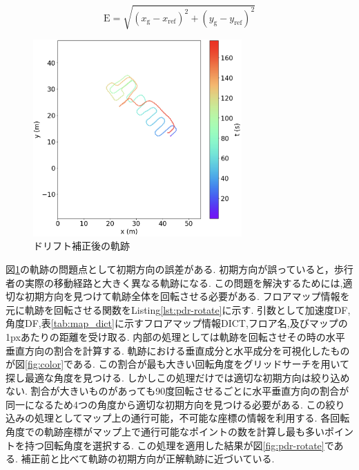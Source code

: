 \vspace{5mm} %
\begin{equation}
	\mathrm{E} = \sqrt{(x_{\mathrm{g}} - x_{\mathrm{ref}})^2 + (y_{\mathrm{g}} - y_{\mathrm{ref}})^2}
\end{equation}
\vspace{5mm} %

\begin{figure}[h]
	\centering
	\includegraphics[width=80mm]{image/pdr-remove-drift-two.jpg}
	\caption{ドリフト補正後の軌跡}    \label{fig:pdr-remove-drift}
\end{figure}


図\ref{fig:pdr-remove-drift}の軌跡の問題点として初期方向の誤差がある.
初期方向が誤っていると，歩行者の実際の移動経路と大きく異なる軌跡になる.
この問題を解決するためには,適切な初期方向を見つけて軌跡全体を回転させる必要がある.
フロアマップ情報を元に軌跡を回転させる関数をListing\ref{lst:pdr-rotate}に示す.
引数として加速度DF,角度DF,表\ref{tab:map_dict}に示すフロアマップ情報DICT,フロア名,及びマップの1pxあたりの距離を受け取る.
内部の処理としては軌跡を回転させその時の水平垂直方向の割合を計算する.
軌跡における垂直成分と水平成分を可視化したものが図\ref{fig:color}である.
この割合が最も大きい回転角度をグリッドサーチを用いて探し最適な角度を見つける.
しかしこの処理だけでは適切な初期方向は絞り込めない.
割合が大きいものがあっても90度回転させるごとに水平垂直方向の割合が同一になるため4つの角度から適切な初期方向を見つける必要がある.
この絞り込みの処理としてマップ上の通行可能，不可能な座標の情報を利用する.
各回転角度での軌跡座標がマップ上で通行可能なポイントの数を計算し最も多いポイントを持つ回転角度を選択する.
この処理を適用した結果が図\ref{fig:pdr-rotate}である.
補正前と比べて軌跡の初期方向が正解軌跡に近づいている.


